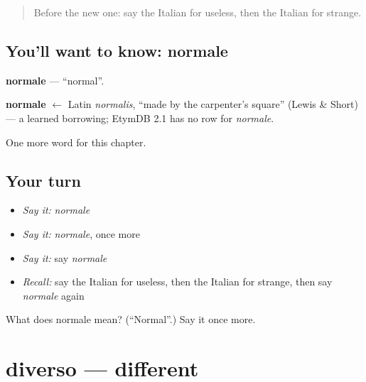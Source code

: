 \label{lesson:IT-C190-normale}



\begin{quote}
Before the new one: say the Italian for useless, then the Italian for strange.
\end{quote}

\subsection*{You'll want to know: normale}
\textbf{normale} — \textquotedblleft{}normal\textquotedblright{}.

\begin{cousinweb}
\textbf{normale} $\leftarrow$ Latin \emph{normalis}, \textquotedblleft{}made by the carpenter's square\textquotedblright{} (Lewis \& Short) — a learned borrowing; EtymDB 2.1 has no row for \emph{normale}.
\end{cousinweb}

\begin{grammarlens}[title={What you've built}]
One more word for this chapter.
\end{grammarlens}

\subsection*{Your turn}
\begin{itemize}
\raggedright
  \item \emph{Say it:} \emph{normale}
  \item \emph{Say it:} \emph{normale}, once more
  \item \emph{Say it:} say \emph{normale}
  \item \emph{Recall:} say the Italian for useless, then the Italian for strange, then say \emph{normale} again
\end{itemize}

\begin{tcolorbox}[breakable,colback=teal!4,colframe=teal!35!black,title={Before you move on}]
What does normale mean? (\textquotedblleft{}Normal\textquotedblright{}.) Say it once more.
\end{tcolorbox}
\section[diverso]{diverso — different}

\label{lesson:IT-C190-diverso}



